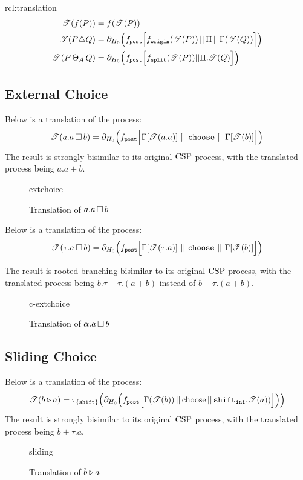 \documentclass[../hons_project.tex]{subfiles}
\begin{document}
\begin{rcl}[Translation]{rcl:translation}{}
\begin{align*}
		\mathscr{T}(f(P))           & = f(\mathscr{T}(P))                                                                                                                                                                               \\
		\mathscr{T}(P \triangle Q) & = \partial_{H_{0}}\Bigl(f_{\mathtt{post}}\Bigl[ f_{\mathtt{origin}}(\mathscr{T}(P)) \,\vert\vert\, \Pi \,\vert\vert\, \Gamma(\mathscr{T}(Q)) \Bigr]\Bigr)                                                                          \\
		\mathscr{T}(P \,\Theta_{A}\, Q)     & = \partial_{H_{0}}\Bigl(f_{\mathtt{post}} \Bigl[ f_{\mathtt{split}}(\mathscr{T}(P)) | | \Pi.\mathscr{T}(Q) \Bigr]\Bigr)
	\end{align*}
\end{rcl}

\newpage
\subsection{External Choice}
Below is a translation of the process:
\[\mathscr{T}(a.a \,\square\, b) = \partial_{H_{0}}\Bigl(f_{\mathtt{post}}\Bigl[\Gamma[\mathscr{T}(a.a)]\, \,\vert\vert\, \,\mathtt{choose}\, \,\vert\vert\, \,\Gamma[\mathscr{T}(b)]\Bigl]\Bigr)\]
The result is strongly bisimilar to its original $\mathrm{CSP}$ process, with the translated process being $a.a + b$.
\begin{figure}[H]
	\centering
	{extchoice}
	\caption{Translation of $a.a \,\square\, b$}
\end{figure}
Below is a translation of the process:
\[\mathscr{T}(\tau.a \,\square\, b) = \partial_{H_{0}}\Bigl(f_{\mathtt{post}}\Bigl[\Gamma[\mathscr{T}(\tau.a)]\, \,\vert\vert\, \,\mathtt{choose}\, \,\vert\vert\, \,\Gamma[\mathscr{T}(b)]\Bigl]\Bigr)\]

The result is rooted branching bisimilar to its original $\mathrm{CSP}$ process, with the translated process being $b.\tau + \tau.(a + b)$ instead of $b + \tau.(a + b)$.

\begin{figure}[H]
	{c-extchoice}
	\caption{Translation of $\alpha.a \,\square\, b$}
\end{figure}


\subsection{Sliding Choice}
Below is a translation of the process:
\[\mathscr{T}(b \triangleright a)    = \tau_{\{\mathtt{shift}\}}\Bigl(\partial_{H_{0}}\Bigl(f_{\mathtt{post}}\Bigl[ \Gamma(\mathscr{T}(b)) \,\vert\vert\, \mathrm{choose} \,\vert\vert\, \mathtt{shift}_{\mathtt{ini}} . \mathscr{T}(a)) \Bigr]\Bigr)\Bigr)\]
The result is strongly bisimilar to its original $\mathrm{CSP}$ process, with the translated process being $b + \tau.a$.
\begin{figure}[H]
	{sliding}
	\caption{Translation of $b \triangleright a$}
\end{figure}
\end{document}
